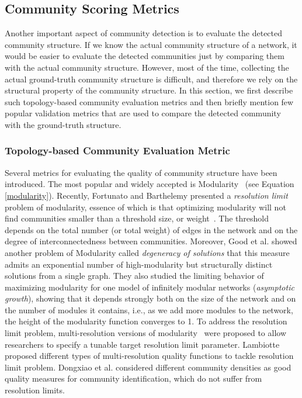 \subsection{Community Scoring Metrics}
Another important aspect of community detection is to evaluate the detected community structure. If we know the actual community structure
of a network, it would be easier to evaluate the detected communities just by comparing them with the actual community structure. However,
most of the time, collecting the actual ground-truth community structure is difficult, and therefore we rely on the structural property of
the community structure. In this section, we first describe such topology-based community evaluation metrics and then briefly mention few
popular validation metrics that are used to compare the detected community with the ground-truth structure.


\subsubsection*{Topology-based Community Evaluation Metric}
Several metrics for evaluating the quality of community structure have been introduced. The most popular and widely accepted is
Modularity~\cite{ng2002} (see Equation \ref{modularity}). Recently, Fortunato and Barthelemy \cite{Barthelemy} presented a {\it
resolution limit} problem of modularity, essence of which is that optimizing modularity will not find communities smaller than a threshold
size, or weight~\cite{Berry_PRE2011}. The threshold depends on the total number (or total weight) of edges in the network and on the degree
of interconnectedness between communities. Moreover, Good et al. \cite{gmc2010} showed another problem of Modularity called {\it degeneracy
of solutions} that this measure admits an exponential number of high-modularity but structurally distinct solutions from a single graph.
They also studied the limiting behavior of maximizing modularity for one model of infinitely modular networks ({\it asymptotic growth}),
showing that it depends strongly both on the size of the network and on the number of modules it contains, i.e., as we add more modules to
the network, the height of the modularity function converges to 1. To address the resolution limit problem, multi-resolution versions of
modularity~\cite{Arenas} were proposed to allow researchers to specify a tunable target resolution limit parameter.
Lambiotte \cite{Renaud} proposed different types of multi-resolution quality functions to tackle resolution limit problem.
Dongxiao et al. \cite{Dongxiao} considered different community densities as good quality measures for community identification, which do not
suffer from resolution limits. 

